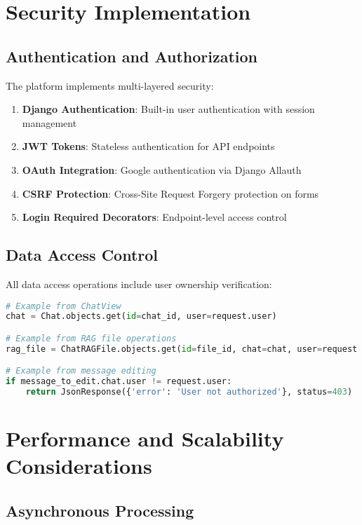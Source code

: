 \documentclass[12pt,a4paper]{article}
\begin{document}
\section{Security Implementation}

\subsection{Authentication and Authorization}

The platform implements multi-layered security:

\begin{enumerate}
    \item \textbf{Django Authentication}: Built-in user authentication with session management
    \item \textbf{JWT Tokens}: Stateless authentication for API endpoints
    \item \textbf{OAuth Integration}: Google authentication via Django Allauth
    \item \textbf{CSRF Protection}: Cross-Site Request Forgery protection on forms
    \item \textbf{Login Required Decorators}: Endpoint-level access control
\end{enumerate}

\subsection{Data Access Control}

All data access operations include user ownership verification:

\begin{lstlisting}[language=Python, caption=Security Access Patterns]
# Example from ChatView
chat = Chat.objects.get(id=chat_id, user=request.user)

# Example from RAG file operations
rag_file = ChatRAGFile.objects.get(id=file_id, chat=chat, user=request.user)

# Example from message editing
if message_to_edit.chat.user != request.user:
    return JsonResponse({'error': 'User not authorized'}, status=403)
\end{lstlisting}

\section{Performance and Scalability Considerations}

\subsection{Asynchronous Processing}
\end{document}

